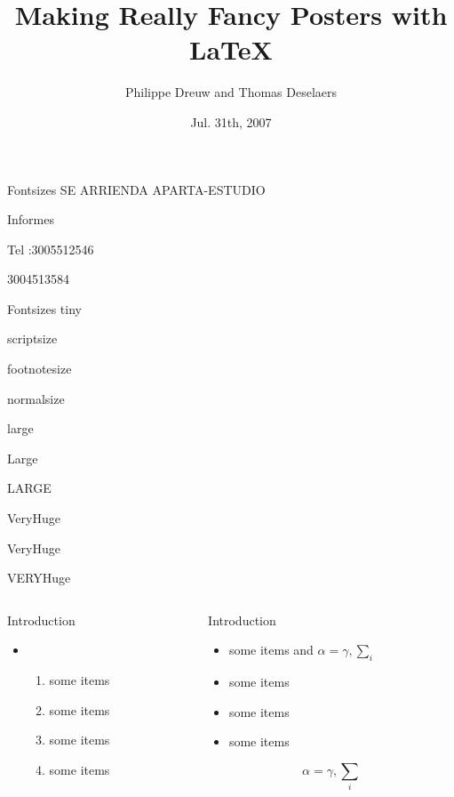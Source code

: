 \documentclass[final]{beamer}
\title[Fancy Posters]{Making Really Fancy Posters with \LaTeX}
\author[Dreuw \& Deselaers]{Philippe Dreuw and Thomas Deselaers}
\institute[RWTH Aachen University]{Human Language Technology and Pattern Recognition,RWTH Aachen University}
\date{Jul. 31th, 2007}
\begin{document}
  \begin{frame}{} 
    \vfill
    \begin{block}{\large Fontsizes}
      \centering
      {\VeryHuge SE ARRIENDA APARTA-ESTUDIO}\par
      {\Large Informes}\par
      {\large Tel :3005512546}\par
      {\large 3004513584}\par
    \end{block}
    \vfill
    \vfill
    \begin{block}{\large Fontsizes}
      \centering
      {\tiny tiny}\par
      {\scriptsize scriptsize}\par
      {\footnotesize footnotesize}\par
      {\normalsize normalsize}\par
      {\large large}\par
      {\Large Large}\par
      {\LARGE LARGE}\par
      {\veryHuge VeryHuge}\par
      {\VeryHuge VeryHuge}\par
      {\VERYHuge VERYHuge}\par
    \end{block}
    \vfill
    \begin{columns}[t]
      \begin{column}{.48\linewidth}
        \begin{block}{Introduction}

          \begin{itemize}
          \item[]
            \begin{enumerate}
            \item some items
            \item some items
            \item some items
            \item some items
            \end{enumerate}    
          \end{itemize}
        \end{block}
      \end{column}
      \begin{column}{.48\linewidth}
        \begin{block}{Introduction}
          \begin{itemize}
          \item some items and $\alpha=\gamma, \sum_{i}$
          \item some items
          \item some items
          \item some items
          \end{itemize}
          $$\alpha=\gamma, \sum_{i}$$
        \end{block}


\end{column}
\end{columns}
\end{frame}
\end{document}
